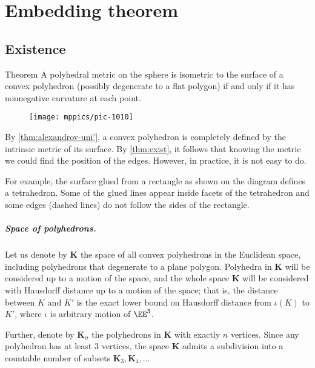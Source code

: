 \chapter{Embedding theorem}

\section{Existence}\label{sec:Alexandrov-existence}

\begin{thm}{Theorem}\label{thm:exist}
A polyhedral metric on the sphere is isometric to the surface of a convex polyhedron (possibly degenerate to a flat polygon) if and only if it has nonnegative curvature at each point.
\end{thm}

\begin{wrapfigure}{r}{30mm}
\vskip-5mm
\centering
\texttt{[image: mppics/pic-1010]}
\vskip-0mm
\end{wrapfigure}

By \ref{thm:alexandrov-uni'}, a convex polyhedron is completely defined by the intrinsic metric of its surface.
By \ref{thm:exist}, it follows that knowing the metric we could find the position of the edges.
However, in practice, it is not easy to do.

For example, the surface glued from a rectangle as shown on the diagram defines a tetrahedron.
Some of the glued lines appear inside facets of the tetrahedron and some edges (dashed lines) do not follow the sides of the rectangle.

\paragraph{Space of polyhedrons.}
Let us denote by $\mathbf{K}$ the space of all convex polyhedrons in the Euclidean space,
including polyhedrons that degenerate to a plane polygon.
Polyhedra in $\mathbf{K}$ will be considered up to a motion of the space,
and the whole space $\mathbf{K}$ will be considered with Hausdorff distance up to a motion of the space;
that is, the distance between $K$ and $K'$ is the exact lower bound on Hausdorff distance from $\iota(K)$ to $K'$, where $\iota$ is arbitrary motion of $\EE^3$.

Further, denote by $\mathbf{K}_n$ the polyhedrons in $\mathbf{K}$ with exactly $n$ vertices.
Since any polyhedron has at least 3 vertices, the space $\mathbf{K}$ admits a subdivision into a countable number of subsets $\mathbf{K}_3,\mathbf{K}_4,\dots$

